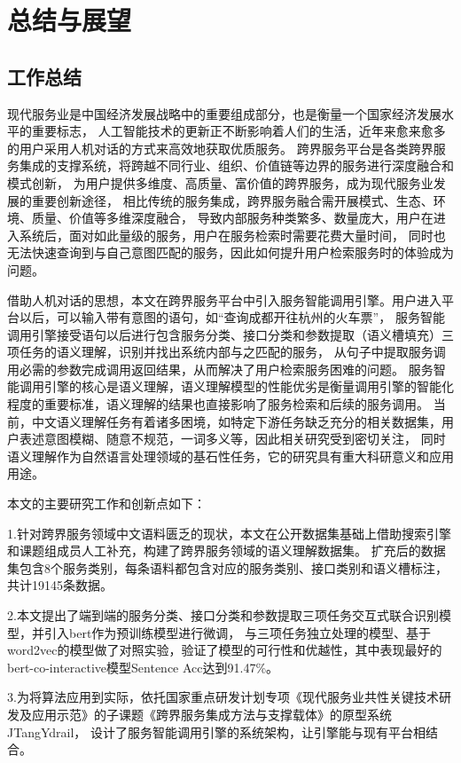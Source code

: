 \chapter{总结与展望}
\section{工作总结}
现代服务业是中国经济发展战略中的重要组成部分，也是衡量一个国家经济发展水平的重要标志，
人工智能技术的更新正不断影响着人们的生活，近年来愈来愈多的用户采用人机对话的方式来高效地获取优质服务。
跨界服务平台是各类跨界服务集成的支撑系统，将跨越不同行业、组织、价值链等边界的服务进行深度融合和模式创新，
为用户提供多维度、高质量、富价值的跨界服务，成为现代服务业发展的重要创新途径，
相比传统的服务集成，跨界服务融合需开展模式、生态、环境、质量、价值等多维深度融合，
导致内部服务种类繁多、数量庞大，用户在进入系统后，面对如此量级的服务，用户在服务检索时需要花费大量时间，
同时也无法快速查询到与自己意图匹配的服务，因此如何提升用户检索服务时的体验成为问题。

借助人机对话的思想，本文在跨界服务平台中引入服务智能调用引擎。用户进入平台以后，可以输入带有意图的语句，如“查询成都开往杭州的火车票”，
服务智能调用引擎接受语句以后进行包含服务分类、接口分类和参数提取（语义槽填充）三项任务的语义理解，识别并找出系统内部与之匹配的服务，
从句子中提取服务调用必需的参数完成调用返回结果，从而解决了用户检索服务困难的问题。
服务智能调用引擎的核心是语义理解，语义理解模型的性能优劣是衡量调用引擎的智能化程度的重要标准，语义理解的结果也直接影响了服务检索和后续的服务调用。
当前，中文语义理解任务有着诸多困境，如特定下游任务缺乏充分的相关数据集，用户表述意图模糊、随意不规范，一词多义等，因此相关研究受到密切关注，
同时语义理解作为自然语言处理领域的基石性任务，它的研究具有重大科研意义和应用用途。

本文的主要研究工作和创新点如下：

1.针对跨界服务领域中文语料匮乏的现状，本文在公开数据集基础上借助搜索引擎和课题组成员人工补充，构建了跨界服务领域的语义理解数据集。
扩充后的数据集包含8个服务类别，每条语料都包含对应的服务类别、接口类别和语义槽标注，共计19145条数据。

2.本文提出了端到端的服务分类、接口分类和参数提取三项任务交互式联合识别模型，并引入bert作为预训练模型进行微调，
与三项任务独立处理的模型、基于word2vec的模型做了对照实验，验证了模型的可行性和优越性，其中表现最好的bert-co-interactive模型Sentence Acc达到91.47\%。

3.为将算法应用到实际，依托国家重点研发计划专项《现代服务业共性关键技术研发及应用示范》的子课题《跨界服务集成方法与支撑载体》的原型系统JTangYdrail，
设计了服务智能调用引擎的系统架构，让引擎能与现有平台相结合。

